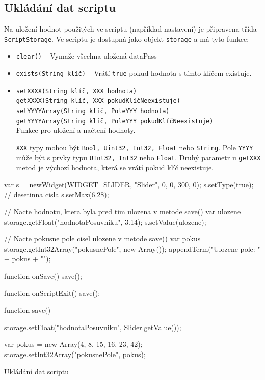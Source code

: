 \documentclass[12pt, a4paper, oneside]{article}
\begin{document}
\newpage
\subsection*{Ukládání dat scriptu}
Na uložení hodnot použitých ve scriptu (například nastavení) je připravena třída \verb|ScriptStorage|. Ve scriptu je dostupná jako objekt \verb|storage| a má tyto funkce:
\begin{itemize}
    \item {\color{blue}\verb/clear()/} -- Vymaže všechna uložená dataPass
    \item {\color{blue}\verb/exists(String klíč)/} -- Vrátí \verb|true| pokud hodnota s tímto klíčem existuje.
    \item {\color{blue}\verb/setXXXX(String klíč, XXX hodnota)/} \\
        {\color{blue}\verb/getXXXX(String klíč, XXX pokudKlíčNeexistuje)/} \\
        {\color{blue}\verb/setYYYYArray(String klíč, PoleYYY hodnota)/} \\
        {\color{blue}\verb/getYYYYArray(String klíč, PoleYYY pokudKlíčNeexistuje)/} \\
            Funkce pro uložení a načtení hodnoty.

        \verb|XXX| typy mohou být \verb|Bool, Uint32, Int32, Float| nebo \verb|String|. Pole \verb|YYYY| může být s prvky typu \verb|UInt32, Int32| nebo \verb|Float|. Druhý parametr u \verb|getXXX| metod je výchozí hodnota, která se vrátí pokud klíč neexistuje.
\end{itemize}

\begin{listing}[H]
\begin{jscode}
var s = newWidget(WIDGET_SLIDER, "Slider", 0, 0, 300, 0);
s.setType(true); // desetinna cisla
s.setMax(6.28);

// Nacte hodnotu, ktera byla pred tim ulozena v metode save()
var ulozene = storage.getFloat("hodnotaPosuvniku", 3.14);
s.setValue(ulozene);

// Nacte pokusne pole cisel ulozene v metode save()
var pokus = storage.getInt32Array("pokusnePole", new Array());
appendTerm("Ulozene pole: " + pokus + "\n");

function onSave() {
    save();
}

function onScriptExit() {
    save();
}

function save() {
    storage.setFloat("hodnotaPosuvniku", Slider.getValue());

    var pokus = new Array(4, 8, 15, 16, 23, 42);
    storage.setInt32Array("pokusnePole", pokus);
}
\end{jscode}
\caption{Ukládání dat scriptu}
\end{listing}
\end{document}
